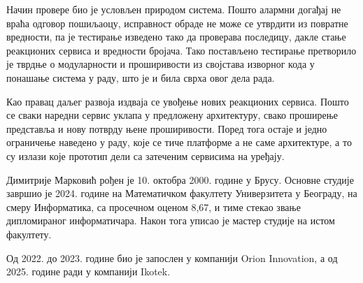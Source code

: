 \documentclass[12pt,oneside]{memoir}
\begin{document}
Начин провере био је условљен природом система. Пошто алармни догађај не враћа одговор
пошиљаоцу, исправност обраде не може се утврдити из повратне вредности, па је тестирање
изведено тако да проверава последицу, дакле стање реакционих сервиса и вредности бројача.
Тако постављено тестирање претворило је тврдње о модуларности и проширивости из својстава
изворног кода у понашање система у раду, што је и била сврха овог дела рада.

Као правац даљег развоја издваја се увођење нових реакционих сервиса. Пошто се сваки наредни
сервис уклапа у предложену архитектуру, свако проширење представља и нову потврду њене
проширивости.
Поред тога остаје и једно ограничење наведено у раду, које се тиче платформе а не саме
архитектуре, а то су излази које прототип дели са затеченим сервисима на уређају.

\literatura

\backmatter

\begin{biografija}
Димитрије Марковић рођен је 10. октобра 2000. године у Брусу. Основне студије завршио је
2024. године на Математичком факултету Универзитета у Београду, на смеру Информатика, са
просечном оценом 8,67, и тиме стекао звање дипломираног информатичара. Након тога уписао је
мастер студије на истом факултету.

Од 2022. до 2023. године био је запослен у компанији {\lat Orion Innovation}, а од 2025.
године ради у компанији {\lat Ikotek}.
\end{biografija}
\end{document}
